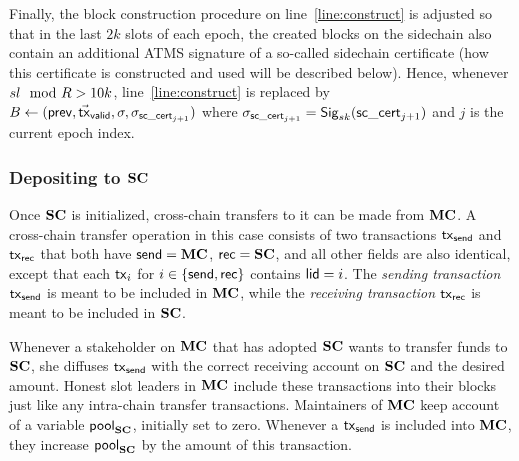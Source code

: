 Finally, the block construction procedure on line~\ref{line:construct} is
adjusted so that in the last $2k$ slots of each epoch, the created blocks on the
sidechain also
contain an additional ATMS signature of a so-called sidechain certificate (how
this certificate is constructed and used will be described below). Hence,
whenever $sl\mod R>10k$, line~\ref{line:construct} is replaced by
$
  B
  \leftarrow
  (\mathsf{prev},\vec{\mathsf{tx}}_{\mathsf{valid}},\sigma,\sigma_{\mathsf{sc\_cert}_{j+1}})
$
where
$\sigma_{\mathsf{sc\_cert}_{j+1}}=\mathsf{Sig}_{sk}(\mathsf{sc\_cert}_{j+1})$ and $j$ is the current epoch index.



\subsubsection{Depositing to $\mathbf{SC}$}

Once $\mathbf{SC}$ is initialized, cross-chain transfers to it can be made from $\mathbf{MC}$.
A cross-chain transfer operation in this
case consists of two transactions $\mathsf{tx}_{\mathsf{send}}$ and $\mathsf{tx}_{\mathsf{rec}}$ that both have
$\mathsf{send}=\mathbf{MC}$, $\mathsf{rec}=\mathbf{SC}$, and all other fields are also identical, except that
each $\mathsf{tx}_i$ for $i\in\{\mathsf{send},\mathsf{rec}\}$ contains $\mathsf{lid}=i$.
The \emph{sending transaction} $\mathsf{tx}_{\mathsf{send}}$ is
meant to be included in $\mathbf{MC}$, while the \emph{receiving transaction} $\mathsf{tx}_{\mathsf{rec}}$ is meant to be included in
$\mathbf{SC}$.

    Whenever a stakeholder on $\mathbf{MC}$ that has adopted $\mathbf{SC}$  wants to transfer funds to $\mathbf{SC}$, she
    diffuses $\mathsf{tx}_{\mathsf{send}}$ with the correct receiving account on
    $\mathbf{SC}$ and the desired amount.
    Honest slot leaders in $\mathbf{MC}$
    include these transactions into their blocks just like any
    intra-chain transfer transactions.
    Maintainers of $\mathbf{MC}$ keep account of a variable $\mathsf{pool}_{\mathbf{SC}}$, initially set
    to zero. Whenever a $\mathsf{tx}_{\mathsf{send}}$ is included into $\mathbf{MC}$, they increase
    $\mathsf{pool}_{\mathbf{SC}}$ by the amount of this transaction.


